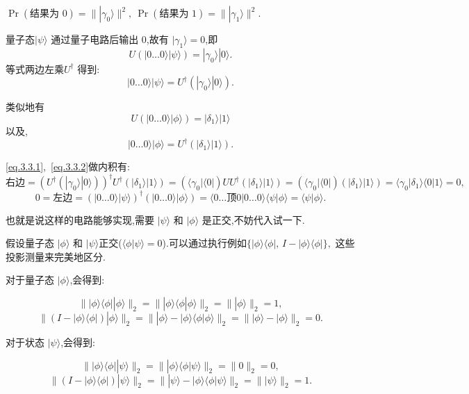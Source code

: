 $\Pr(\text{结果为 0}) = \| | \gamma_0 \rangle \|^2 ,~\Pr(\text{结果为 1}) = \| | \gamma_1 \rangle \|^2.$

量子态$|\psi\rangle$ 通过量子电路后输出 0,故有 $| \gamma_1 \rangle = 0$,即
\begin{equation*}
U(|0 \ldots 0\rangle |\psi\rangle) = | \gamma_0 \rangle |0\rangle.
\end{equation*}
等式两边左乘$U^\dagger$ 得到:
\begin{equation}\label{eq.3.3.1}
|0 \ldots 0\rangle |\psi\rangle = U^\dagger(| \gamma_0 \rangle |0\rangle).
\end{equation}

类似地有
\begin{equation*}
U(|0 \ldots 0\rangle |\phi\rangle) = | \delta_1 \rangle |1\rangle
\end{equation*}
以及,
\begin{equation}\label{eq.3.3.2}
|0 \ldots 0\rangle |\phi\rangle = U^\dagger(| \delta_1 \rangle |1\rangle).
\end{equation}

\cref{eq.3.3.1},~\cref{eq.3.3.2}做内积有:
$$
\text{右边}=(U^\dagger(| \gamma_0 \rangle |0\rangle))^{\dagger} U^\dagger(| \delta_1 \rangle |1\rangle)= (\langle \gamma_0 | \langle 0 |) U U^\dagger(| \delta_1 \rangle |1\rangle) = (\langle \gamma_0 | \langle 0 |)(| \delta_1 \rangle |1\rangle) = \langle \gamma_0 | \delta_1 \rangle \langle 0 |  1\rangle = 0,
$$
$$
0 = \text{左边}=(|0 \ldots 0\rangle |\psi\rangle)^{\dagger}(|0 \ldots 0\rangle |\phi\rangle) = \langle 0 \ldots 顶 0 | 0 \ldots 0\rangle \langle \psi | \phi\rangle = \langle \psi | \phi\rangle.
$$

也就是说这样的电路能够实现,需要 $|\psi\rangle$ 和 $|\phi\rangle$ 是正交,不妨代入试一下.

假设量子态 $|\phi\rangle$ 和 $|\psi\rangle$正交($\langle \phi | \psi \rangle = 0$).可以通过执行例如$\{|\phi\rangle \langle \phi|, \, I - |\phi\rangle \langle \phi|\},$ 这些投影测量来完美地区分.

对于量子态 $|\phi\rangle$,会得到:

$$
\| |\phi\rangle \langle \phi| |\phi\rangle \|_2 = \| |\phi\rangle \langle \phi|\phi\rangle \|_2 = \| |\phi\rangle \|_2 = 1,
$$
$$
\| (I - |\phi\rangle \langle \phi|) |\phi\rangle \|_2 = \| |\phi\rangle - |\phi\rangle \langle \phi|\phi\rangle \|_2 = \| |\phi\rangle - |\phi\rangle \|_2 = 0.
$$

对于状态 $|\psi\rangle$,会得到:

$$
\| |\phi\rangle \langle \phi| |\psi\rangle \|_2 = \| |\phi\rangle \langle \phi|\psi\rangle \|_2 = \| 0 \|_2 = 0,
$$
$$
\| (I - |\phi\rangle \langle \phi|) |\psi\rangle \|_2 = \| |\psi\rangle - |\phi\rangle \langle \phi|\psi\rangle \|_2 = \| |\psi\rangle \|_2 = 1.
$$




